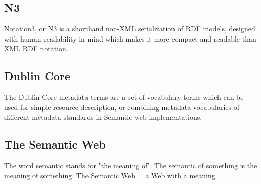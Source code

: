 \subsection*{N3}
Notation3, or N3 is a shorthand non-XML serialization of RDF models,
designed with human-readability in mind which makes it more compact and
readable than XML RDF notation.

\subsection*{Dublin Core}
The Dublin Core metadata terms are a set of vocabulary terms which
can be used for simple resource description, or combining metadata
vocabularies of different metadata standards in Semantic web implementations.

\subsection*{The Semantic Web}
The word semantic stands for "the meaning of". The semantic of something is the meaning of something. The Semantic Web = a Web with a meaning.